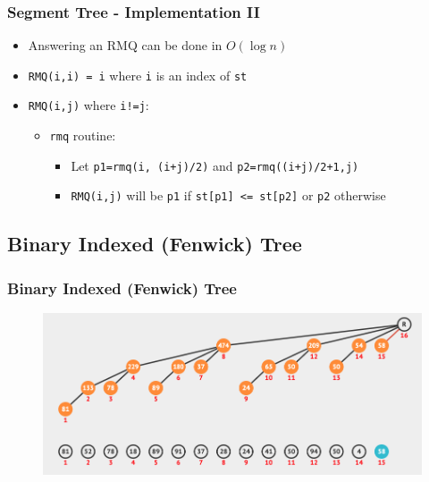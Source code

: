 \documentclass{beamer}
\begin{document}
\begin{frame}[fragile]
\frametitle{Segment Tree - Implementation II}
	\begin{itemize}
	    \item Answering an RMQ can be done in $O(\log n)$
	    \item \verb|RMQ(i,i) = i| where \verb|i| is an index of \verb|st|
	    \item \verb|RMQ(i,j)| where \verb|i!=j|:
	    	\begin{itemize}
			    \item \verb|rmq| routine:
			    	\begin{itemize}
					    \item Let \verb|p1=rmq(i, (i+j)/2)| and \verb|p2=rmq((i+j)/2+1,j)|
					    \item \verb|RMQ(i,j)| will be \verb|p1| if \verb|st[p1] <= st[p2]| or \verb|p2| otherwise
					\end{itemize}
			\end{itemize}
	\end{itemize}
\end{frame}


\subsection{Binary Indexed (Fenwick) Tree}

\begin{frame}[fragile]
\frametitle{Binary Indexed (Fenwick) Tree}
	\begin{figure}
	    \centering
	    \includegraphics[scale=0.3]{imgs/2.4/fenwick-tree/fenwick-tree.png}
	\end{figure}
\end{frame}
\end{document}
